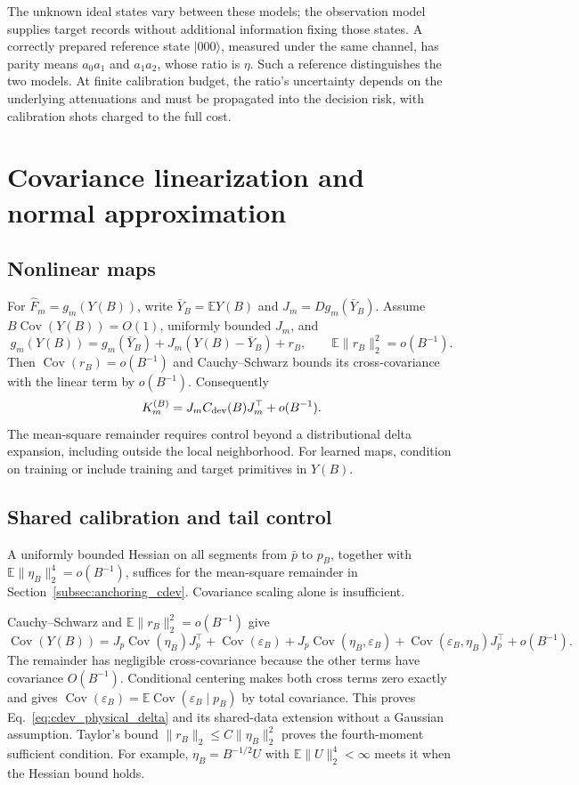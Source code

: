\documentclass[a4paper,onecolumn,unpublished,nopdfoutputerror]{quantumarticle}
\theoremstyle{plain}
\theoremstyle{definition}
\newcommand{\E}{\mathbb{E}}
\newcommand{\Cov}{\operatorname{Cov}}
\newcommand{\1}{\mathbf{1}}
\begin{document}
The unknown ideal states vary between these models; the observation model supplies target records without additional information fixing those states. A correctly prepared reference state $|000\rangle$, measured under the same channel, has parity means $a_0a_1$ and $a_1a_2$, whose ratio is $\eta$. Such a reference distinguishes the two models. At finite calibration budget, the ratio's uncertainty depends on the underlying attenuations and must be propagated into the decision risk, with calibration shots charged to the full cost.

\section{Covariance linearization and normal approximation}
\label{app:covariance_clt}

\subsection{Nonlinear maps}

For $\widehat F_m=g_m(Y(B))$, write $\bar Y_B=\E Y(B)$ and $J_m=Dg_m(\bar Y_B)$. Assume $B\Cov(Y(B))=O(1)$, uniformly bounded $J_m$, and
\[
g_m(Y(B))=g_m(\bar Y_B)+J_m(Y(B)-\bar Y_B)+r_B,
\qquad \E\|r_B\|_2^2=o(B^{-1}).
\]
Then $\Cov(r_B)=o(B^{-1})$ and Cauchy--Schwarz bounds its cross-covariance with the linear term by $o(B^{-1})$. Consequently
\begin{equation}
K_m^{(B)}=J_mC_{\rm dev}(B)J_m^\top+o(B^{-1}).
\end{equation}
The mean-square remainder requires control beyond a distributional delta expansion, including outside the local neighborhood. For learned maps, condition on training or include training and target primitives in $Y(B)$.

\subsection{Shared calibration and tail control}
\label{app:calibration_covariance}
A uniformly bounded Hessian on all segments from $\bar p$ to $p_B$, together with $\E\|\eta_B\|_2^4=o(B^{-1})$, suffices for the mean-square remainder in Section~\ref{subsec:anchoring_cdev}. Covariance scaling alone is insufficient.

Cauchy--Schwarz and $\E\|r_B\|_2^2=o(B^{-1})$ give
\[
\Cov(Y(B))=J_p\Cov(\eta_B)J_p^\top+\Cov(\varepsilon_B)
+J_p\Cov(\eta_B,\varepsilon_B)+\Cov(\varepsilon_B,\eta_B)J_p^\top
+o(B^{-1}).
\]
The remainder has negligible cross-covariance because the other terms have covariance $O(B^{-1})$. Conditional centering makes both cross terms zero exactly and gives $\Cov(\varepsilon_B)=\E\Cov(\varepsilon_B\mid p_B)$ by total covariance. This proves Eq.~\eqref{eq:cdev_physical_delta} and its shared-data extension without a Gaussian assumption. Taylor's bound $\|r_B\|_2\le C\|\eta_B\|_2^2$ proves the fourth-moment sufficient condition. For example, $\eta_B=B^{-1/2}U$ with $\E\|U\|_2^4<\infty$ meets it when the Hessian bound holds.
\end{document}
